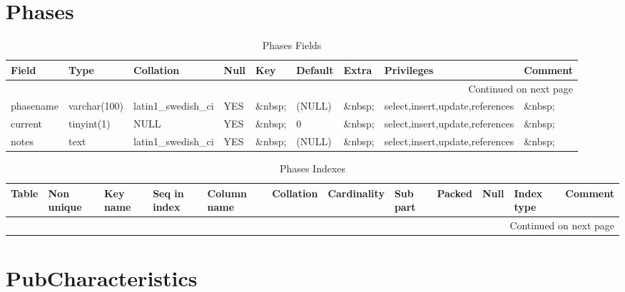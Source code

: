 \documentclass[tablesignature,landscape]{scrartcl}
\begin{document}
\section{Phases}
\label{sec-16}


\begin{longtable}{|l|l|l|l|l|l|l|l|l|}
\caption{Phases Fields} \label{tbl:phasesfields}\\
\hline
 Field      &  Type          &  Collation                &  Null     &  Key      &  Default  &  Extra              &  Privileges                       &  Comment \\
\hline
\endhead
\hline\multicolumn{9}{r}{Continued on next page}\
\endfoot
\endlastfoot
\hline
 phaseid    &  int(11)       &  NULL                     &  \&nbsp;  &  PRI      &  (NULL)   &  auto\_{}increment  &  select,insert,update,references  &  \&nbsp;  \\
 phasename  &  varchar(100)  &  latin1\_{}swedish\_{}ci  &  YES      &  \&nbsp;  &  (NULL)   &  \&nbsp;            &  select,insert,update,references  &  \&nbsp;  \\
 current    &  tinyint(1)    &  NULL                     &  YES      &  \&nbsp;  &  0        &  \&nbsp;            &  select,insert,update,references  &  \&nbsp;  \\
 notes      &  text          &  latin1\_{}swedish\_{}ci  &  YES      &  \&nbsp;  &  (NULL)   &  \&nbsp;            &  select,insert,update,references  &  \&nbsp;  \\
\hline
\end{longtable}


\begin{longtable}{|l|l|l|l|l|l|l|l|l|l|l|l|}
\caption{Phases Indexes} \label{tbl:phasesindexes}\\
\hline
 Table   &  Non unique  &  Key name  &  Seq in index  &  Column name  &  Collation  &  Cardinality  &  Sub part  &  Packed  &  Null     &  Index type  &  Comment \\
\hline
\endhead
\hline\multicolumn{12}{r}{Continued on next page}\
\endfoot
\endlastfoot
\hline
 Phases  &           0  &  PRIMARY   &             1  &  phaseid      &  A          &            4  &  (NULL)    &  (NULL)  &  \&nbsp;  &  BTREE       &  \&nbsp;  \\
\hline
\end{longtable}
\section{PubCharacteristics}
\label{sec-17}
\end{document}
